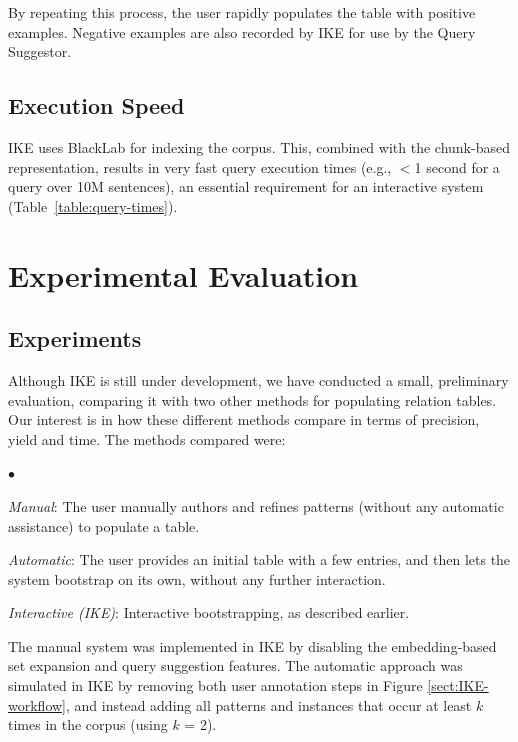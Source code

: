 \documentclass[11pt,letterpaper]{article}
\newcommand{\squishlist}{
   \begin{list}{$\bullet$}
    { \setlength{\itemsep}{-1pt}      \setlength{\parsep}{3pt}
      \setlength{\topsep}{1pt}       \setlength{\partopsep}{0pt}
      \setlength{\leftmargin}{1.5em} \setlength{\labelwidth}{1em}
      \setlength{\labelsep}{0.5em} } }
\newcommand{\squishend}{
    \end{list}  }
\begin{document}
By repeating this process, the user rapidly populates the table with positive examples. Negative examples are also recorded by IKE for use by the Query Suggestor.

\subsection{Execution Speed}

IKE uses BlackLab \cite{blacklab-tool} for indexing the corpus. This, combined with the chunk-based representation, results in very fast query execution times
(e.g., $<$1 second for a query over 10M sentences), an essential requirement for an interactive system (Table~\ref{table:query-times}).

\begin{table}[tbh]
\centering
\boldmath
{}
\caption{Avg. query-times with different sized corpora.}
\label{table:query-times}
\end{table}

\section{Experimental Evaluation} \label{sect:expt-eval}

\subsection{Experiments}

Although IKE is still under development, we have conducted a small, preliminary evaluation, comparing it with two other methods for populating relation tables. Our interest is in how these different methods compare in terms of precision, yield and time. The methods compared were:
\squishlist
\item \emph{Manual}: The user manually authors and refines patterns (without any automatic assistance) to populate a table.
\item \emph{Automatic}: The user provides an initial table with a few entries, and then lets the system bootstrap on its own, without any further interaction.
\item \emph{Interactive (IKE)}: Interactive bootstrapping, as described earlier.
\squishend
The manual system was implemented in IKE by disabling the embedding-based set expansion and query suggestion features. The automatic approach was simulated in IKE by removing both user annotation steps in Figure \ref{sect:IKE-workflow}, and instead adding all patterns and instances that occur at least $k$ times in the corpus (using $k$ = 2).
\end{document}
